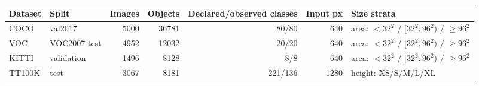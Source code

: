 \begin{tabular}{llrrrrp{5.2cm}}
\toprule
Dataset & Split & Images & Objects & Declared/observed classes & Input px & Size strata \\
\midrule
COCO & val2017 & 5000 & 36781 & 80/80 & 640 & area: $<32^2$ / $[32^2,96^2)$ / $\geq96^2$ \\
VOC & VOC2007 test & 4952 & 12032 & 20/20 & 640 & area: $<32^2$ / $[32^2,96^2)$ / $\geq96^2$ \\
KITTI & validation & 1496 & 8128 & 8/8 & 640 & area: $<32^2$ / $[32^2,96^2)$ / $\geq96^2$ \\
TT100K & test & 3067 & 8181 & 221/136 & 1280 & height: XS/S/M/L/XL \\
\bottomrule
\end{tabular}
